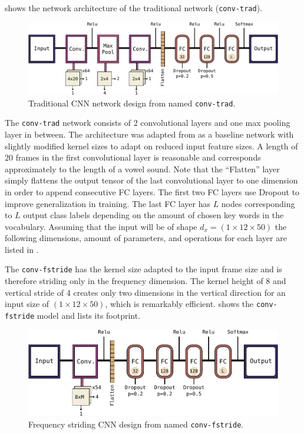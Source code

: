  shows the network architecture of the traditional network (\texttt{conv-trad}).
\begin{figure}[!ht]
  \centering
    \includegraphics[height=0.2\textwidth]{./4_nn/figs/nn_arch_cnn_trad.pdf}
  \caption{Traditional CNN network design from \cite{Sainath2015} named \texttt{conv-trad}.}
  \label{fig:nn_arch_cnn_trad}
\end{figure}
\FloatBarrier
\noindent
The \texttt{conv-trad} network consists of 2 convolutional layers and one max pooling layer in between.
The architecture was adapted from \cite{Sainath2015} as a baseline network with slightly modified kernel sizes to adapt on reduced input feature sizes.
A length of 20 frames in the first convolutional layer is reasonable and corresponds approximately to the length of a vowel sound.
Note that the \enquote{Flatten} layer simply flattens the output tensor of the last convolutional layer to one dimension in order to append consecutive FC layers.
The first two FC layers use Dropout to improve generalization in training.
The last FC layer has $L$ nodes corresponding to $L$ output class labels depending on the amount of chosen key words in the vocabulary.
Assuming that the input will be of shape $d_x = (1 \times 12 \times 50)$ the following dimensions, amount of parameters, and operations for each layer are listed in .


The \texttt{conv-fstride} has the kernel size adapted to the input frame size and is therefore striding only in the frequency dimension.
The kernel height of 8 and vertical stride of 4 creates only two dimensions in the vertical direction for an input size of $(1 \times 12 \times 50)$, which is remarkably efficient.
 shows the \texttt{conv-fstride} model and  lists its footprint.
\begin{figure}[!ht]
  \centering
    \includegraphics[height=0.2\textwidth]{./4_nn/figs/nn_arch_cnn_fstride.pdf}
  \caption{Frequency striding CNN design from \cite{Sainath2015} named \texttt{conv-fstride}.}
  \label{fig:nn_arch_cnn_fstride}
\end{figure}
\FloatBarrier
\noindent


